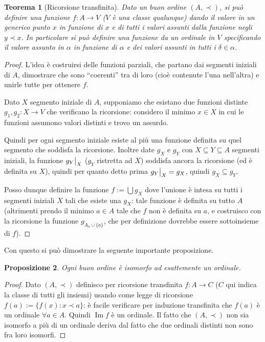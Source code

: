 \documentclass[a4paper,10pt,oneside]{article}
\newcommand\restr[2]{{%
  \left.\kern-\nulldelimiterspace %
  #1 %
  \vphantom{\big|} %
  \right|_{#2} %
  }}
\DeclareMathOperator{\im}{Im}
\theoremstyle{plain}
\newtheorem{mytheorem}{Teorema}[section]
\newtheorem{myprop}[mytheorem]{Proposizione}
\theoremstyle{definition}
\theoremstyle{remark}
\begin{document}
\begin{mytheorem}[Ricorsione transfinita]
 Dato un buon ordine $(A,\prec)$, si può definire una funzione $f:A \rightarrow V$ ($V$ è una classe qualunque) dando il valore in un generico punto $x$ in funzione di $x$ e di tutti i valori assunti dalla funzione negli $y\prec x$. In particolare si può definire una funzione da un ordinale in $V$ specificando il valore assunto in $\alpha$ in funzione di $\alpha$ e dei valori assunti in tutti i $\delta \in \alpha$.
\end{mytheorem}
\begin{proof}
 L'idea è costruirsi delle funzioni parziali, che partano dai segmenti iniziali di $A$, dimostrare che sono ``coerenti'' tra di loro (cioè contenute l'una nell'altra) e unirle tutte per ottenere $f$.
 
 Dato $X$ segmento iniziale di $A$, supponiamo che esistano due funzioni distinte $g_1 , g_2: X \rightarrow V$ che verificano la ricorsione: considero il minimo $x\in X$ in cui le funzioni assumono valori distinti e trovo un assurdo.
 
 Quindi per ogni segmento iniziale esiste al più una funzione definita su quel segmento che soddisfa la ricorsione.
 Inoltre date $g_X$ e $g_Y$ con $X\subseteq Y \subseteq A$ segmenti iniziali, la funzione $\restr{g_Y}X$ ($g_Y$ ristretta ad $X$) soddisfa ancora la ricorsione (ed è definita su $X$), quindi per quanto detto prima $\restr{g_Y}X=g_X$, quindi $g_X\subseteq g_Y$.
 
 Posso dunque definire la funzione $f:=\bigcup g_X$ dove l'unione è intesa su tutti i segmenti iniziali $X$ tali che esiste una $g_X$: tale funzione è definita su tutto $A$ (altrimenti prendo il minimo $a \in A$ tale che $f$ non è definita su $a$, e costruisco con la ricorsione la funzione $g_{A_a \cup \{a\}}$, che per definizione dovrebbe essere sottoinsieme di $f$).
\end{proof}

Con questo si può dimostrare la seguente importante proposizione.

\begin{myprop}\label{prop:isomord}
 Ogni buon ordine è isomorfo ad esattemente un ordinale.
\end{myprop}
\begin{proof}
 Dato $(A,\prec)$ definisco per ricorsione transfinita $f:A\rightarrow C$ ($C$ qui indica la classe di tutti gli insiemi) usando come legge di ricorsione $f(a):=\{f(x): x \prec a\}$: è facile verificare per induzione transfinita che $f(a)$ è un ordinale $\forall a\in A$. Quindi $\im f$ è un ordinale. Il fatto che $(A,\prec)$ non sia isomorfo a più di un ordinale deriva dal fatto che due ordinali distinti non sono fra loro isomorfi.
\end{proof}
\end{document}

